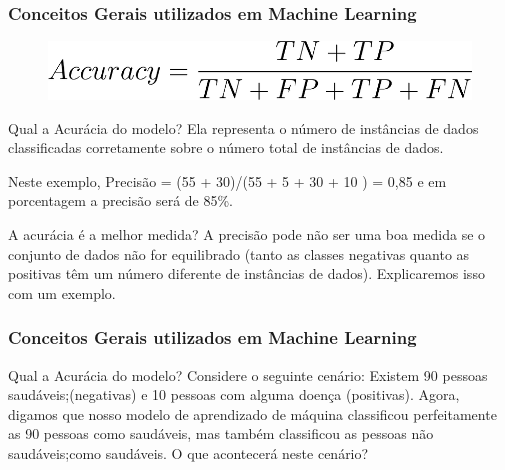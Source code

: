 \documentclass{beamer}
\begin{document}
\begin{frame}
	\frametitle{Conceitos Gerais utilizados em Machine Learning}
	\begin{figure}
		\centering
		\includegraphics[width=0.5\linewidth]{figures/accuracy}
	\end{figure}
	
	\begin{block}{Qual a Acurácia do modelo?}
		Ela representa o número de instâncias de dados classificadas corretamente sobre o número total de instâncias de dados.
		
		Neste exemplo, Precisão = (55 + 30)/(55 + 5 + 30 + 10 ) = 0,85 e em porcentagem a precisão será de 85\%.
	\end{block}
	\begin{alertblock}{A acurácia é a melhor medida?}
		A precisão pode não ser uma boa medida se o conjunto de dados não for equilibrado (tanto as classes negativas quanto as positivas têm um número diferente de instâncias de dados). Explicaremos isso com um exemplo.
	\end{alertblock}

\end{frame}
\begin{frame}
	\frametitle{Conceitos Gerais utilizados em Machine Learning}
	\begin{block}{Qual a Acurácia do modelo?}
	Considere o seguinte cenário: Existem 90 pessoas saudáveis;(negativas) e 10 pessoas com alguma doença (positivas). 
	Agora, digamos que nosso modelo de aprendizado de máquina classificou perfeitamente as 90 pessoas como saudáveis, mas também classificou as pessoas não saudáveis;como saudáveis. 
	O que acontecerá neste cenário?
	\end{block}

\end{frame}
\end{document}

